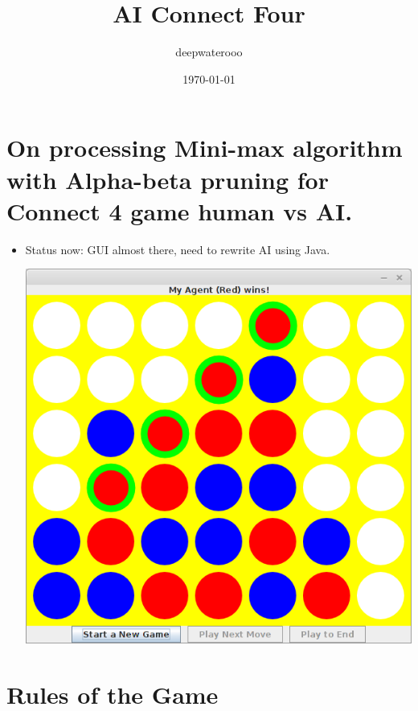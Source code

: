 \documentclass[9pt,b5paper]{article}
\author{deepwaterooo}
\date{\today}
\title{AI Connect Four}
\begin{document}
\maketitle
\tableofcontents


\section{On processing Mini-max algorithm with Alpha-beta pruning for Connect 4 game human vs AI.}
\label{sec-1}
\begin{itemize}
\item Status now: GUI almost there, need to rewrite AI using Java. 

\includegraphics[width=.9\linewidth]{./connect4.png}
\end{itemize}

\section{Rules of the Game}
\label{sec-2}
\end{document}
